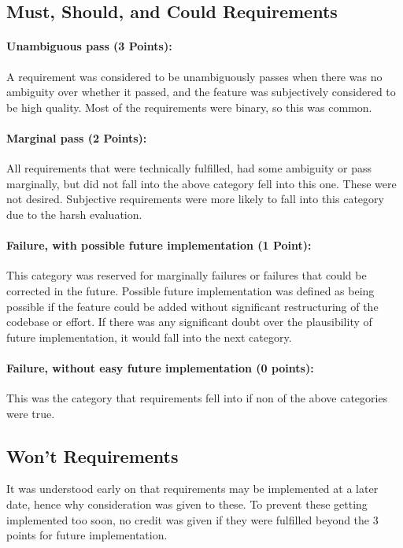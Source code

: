 \subsection{Must, Should, and Could Requirements}

\paragraph{Unambiguous pass (3 Points):} A requirement was considered to be unambiguously passes when there was no ambiguity over whether it passed, and the feature was subjectively considered to be high quality. Most of the requirements were binary, so this was common.

\paragraph{Marginal pass (2 Points):} All requirements that were technically fulfilled, had some ambiguity or pass marginally, but did not fall into the above category fell into this one. These were not desired. Subjective requirements were more likely to fall into this category due to the harsh evaluation.

\paragraph{Failure, with possible future implementation (1 Point):} This category was reserved for marginally failures or failures that could be corrected in the future. Possible future implementation was defined as being possible if the feature could be added without significant restructuring of the codebase or effort. If there was any significant doubt over the plausibility of future implementation, it would fall into the next category.

\paragraph{Failure, without easy future implementation (0 points):} This was the category that requirements fell into if non of the above categories were true.

\subsection{Won't Requirements}

It was understood early on that  requirements may be implemented at a later date, hence why consideration was given to these. To prevent these getting implemented too soon, no credit was given if they were fulfilled beyond the 3 points for future implementation.

